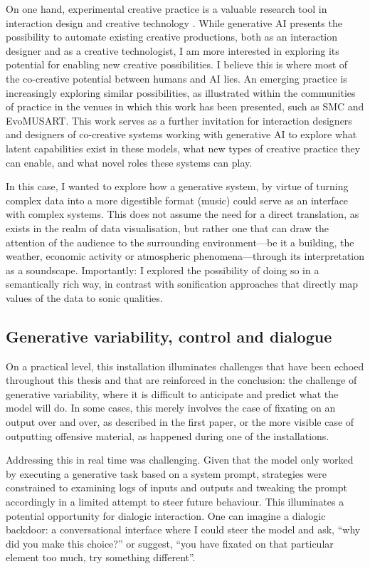 On one hand, experimental creative practice is a valuable research tool in interaction design \cite{Candy2019-vg, Vear2021-cx} and creative technology \cite{Colton2012-jc, Cohen1995-wt, Cope2000-cq, Reichardt1968-eo}. While generative AI presents the possibility to automate existing creative productions, both as an interaction designer and as a creative technologist, I am more interested in exploring its potential for enabling new creative possibilities. I believe this is where most of the co-creative potential between humans and AI lies. An emerging practice is increasingly exploring similar possibilities, as illustrated within the communities of practice in the venues in which this work has been presented, such as SMC and EvoMUSART. This work serves as a further invitation for interaction designers and designers of co-creative systems working with generative AI to explore what latent capabilities exist in these models, what new types of creative practice they can enable, and what novel roles these systems can play.

In this case, I wanted to explore how a generative system, by virtue of turning complex data into a more digestible format (music) could serve as an interface with complex systems. This does not assume the need for a direct translation, as exists in the realm of data visualisation, but rather one that can draw the attention of the audience to the surrounding environment—be it a building, the weather, economic activity or atmospheric phenomena—through its interpretation as a soundscape. Importantly: I explored the possibility of doing so in a semantically rich way, in contrast with sonification approaches that directly map values of the data to sonic qualities. 

\subsection{Generative variability, control and dialogue}

On a practical level, this installation illuminates challenges that have been echoed throughout this thesis and that are reinforced in the conclusion: the challenge of generative variability, where it is difficult to anticipate and predict what the model will do. In some cases, this merely involves the case of fixating on an output over and over, as described in the first paper, or the more visible case of outputting offensive material, as happened during one of the installations.

Addressing this in real time was challenging. Given that the model only worked by executing a generative task based on a system prompt, strategies were constrained to examining logs of inputs and outputs and tweaking the prompt accordingly in a limited attempt to steer future behaviour. This illuminates a potential opportunity for dialogic interaction. One can imagine a dialogic backdoor: a conversational interface where I could steer the model and ask, “why did you make this choice?” or suggest, “you have fixated on that particular element too much, try something different”.

